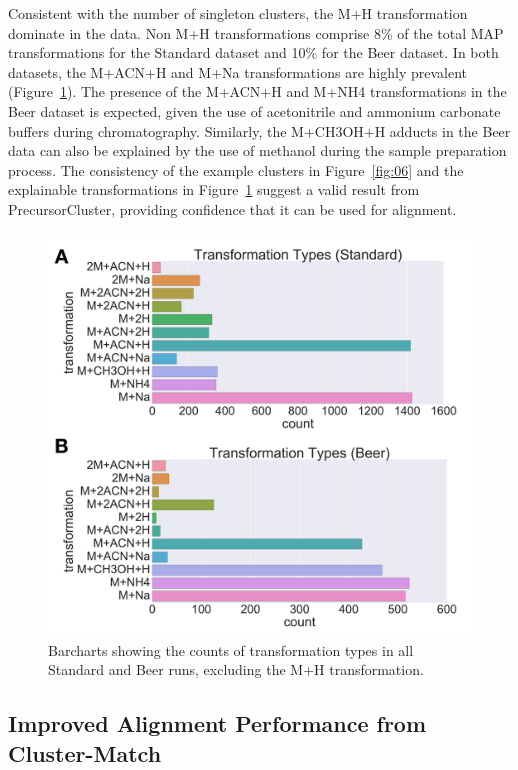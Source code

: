 Consistent with the number of singleton clusters, the M+H transformation dominate in the data. Non M+H transformations comprise 8\% of the total MAP transformations for the Standard dataset and 10\% for the Beer dataset. In both datasets, the M+ACN+H and M+Na transformations are highly prevalent (Figure~\ref{fig:counts-trans}). The presence of the M+ACN+H and M+NH4 transformations in the Beer dataset is expected, given the use of acetonitrile and ammonium carbonate buffers during chromatography. Similarly, the M+CH3OH+H adducts in the Beer data can also be explained by the use of methanol during the sample preparation process. The consistency of the example clusters in Figure~\ref{fig:06} and the explainable transformations in Figure~\ref{fig:counts-trans} suggest a valid result from PrecursorCluster, providing confidence that it can be used for alignment. 

\begin{figure}[htbp]
\centering
\includegraphics[width=0.5\linewidth]{05-precursor-cluster/figures/transformation_counts.pdf}
\caption{\label{fig:counts-trans}Barcharts showing the counts of transformation types in all Standard and Beer runs, excluding the M+H transformation.}
\end{figure}

\subsection{Improved Alignment Performance from Cluster-Match\label{sub:cluster-match-results}}

